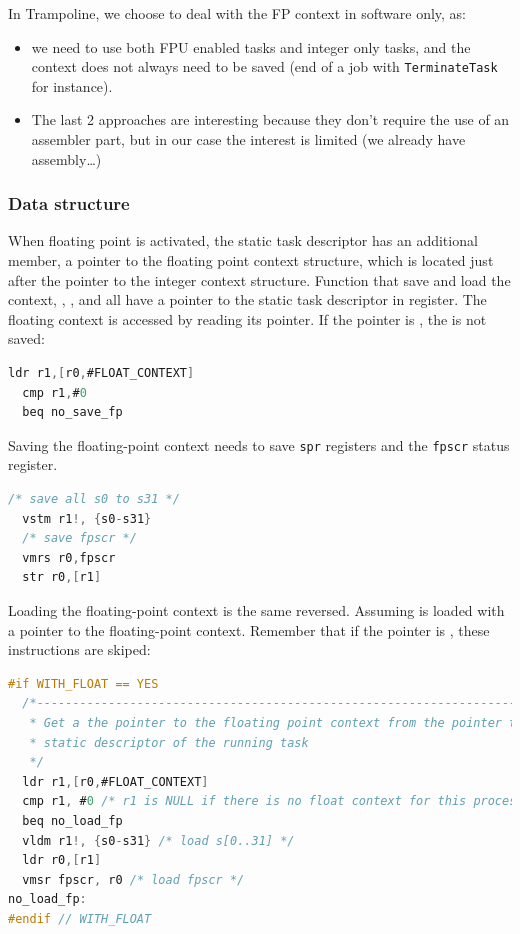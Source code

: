 In Trampoline, we choose to deal with the FP context in software only, as:
\begin{itemize}
  \item we need to use both FPU enabled tasks and integer only tasks, and the context does not always need to be saved (end of a job with \texttt{TerminateTask} for instance). 
  \item The last 2 approaches are interesting because they don't require the use of an assembler part, but in our case the interest is limited (we already have assembly…)
\end{itemize}

\subsubsection{Data structure}

When floating point is activated, the static task descriptor has an additional member, a pointer to the floating point context structure, which is located just after the pointer to the integer context structure. Function that save and load the context, , ,  and  all have a pointer to the static task descriptor in  register. The floating context is accessed by reading its pointer. If the pointer is , the is not saved:

\begin{lstlisting}[language=C]
  ldr r1,[r0,#FLOAT_CONTEXT]
  cmp r1,#0
  beq no_save_fp
\end{lstlisting}

Saving the floating-point context needs to save \texttt{spr} registers and the \texttt{fpscr} status register.

\begin{lstlisting}[language=C]
  /* save all s0 to s31 */
  vstm r1!, {s0-s31}
  /* save fpscr */
  vmrs r0,fpscr
  str r0,[r1]
\end{lstlisting}

Loading the floating-point context is the same reversed. Assuming  is loaded with a pointer to the floating-point context. Remember that if the pointer is , these instructions are skiped:

\begin{lstlisting}[language=C]
#if WITH_FLOAT == YES
  /*-------------------------------------------------------------------------
   * Get a the pointer to the floating point context from the pointer to the
   * static descriptor of the running task
   */
  ldr r1,[r0,#FLOAT_CONTEXT]
  cmp r1, #0 /* r1 is NULL if there is no float context for this process */
  beq no_load_fp
  vldm r1!, {s0-s31} /* load s[0..31] */
  ldr r0,[r1]
  vmsr fpscr, r0 /* load fpscr */
no_load_fp:
#endif // WITH_FLOAT
\end{lstlisting}


